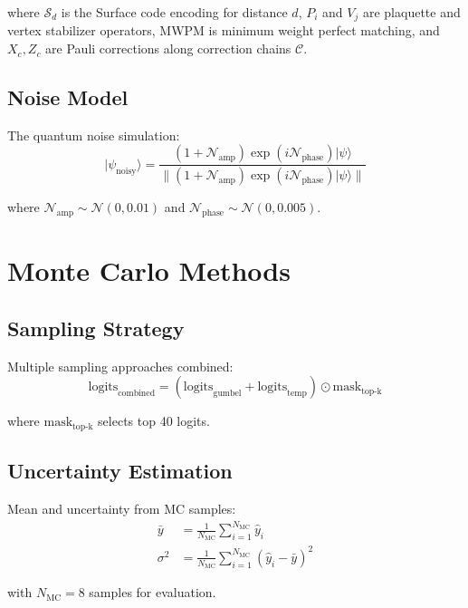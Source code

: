 \documentclass{article}
\begin{document}
where $\mathcal{S}_d$ is the Surface code encoding for distance $d$, $P_i$ and $V_j$ are plaquette and vertex stabilizer operators, MWPM is minimum weight perfect matching, and $X_c, Z_c$ are Pauli corrections along correction chains $\mathcal{C}$.

\subsection{Noise Model}
The quantum noise simulation:
\begin{equation}
|\psi_{\text{noisy}}\rangle = \frac{(1 + \mathcal{N}_{\text{amp}})\exp(i\mathcal{N}_{\text{phase}})|\psi\rangle}{\|(1 + \mathcal{N}_{\text{amp}})\exp(i\mathcal{N}_{\text{phase}})|\psi\rangle\|}
\end{equation}

where $\mathcal{N}_{\text{amp}} \sim \mathcal{N}(0,0.01)$ and $\mathcal{N}_{\text{phase}} \sim \mathcal{N}(0,0.005)$.

\section{Monte Carlo Methods}

\subsection{Sampling Strategy}
Multiple sampling approaches combined:
\begin{equation}
\text{logits}_{\text{combined}} = (\text{logits}_{\text{gumbel}} + \text{logits}_{\text{temp}}) \odot \text{mask}_{\text{top-k}}
\end{equation}

where $\text{mask}_{\text{top-k}}$ selects top 40 logits.

\subsection{Uncertainty Estimation}
Mean and uncertainty from MC samples:
\begin{align*}
\bar{y} &= \frac{1}{N_{\text{MC}}}\sum_{i=1}^{N_{\text{MC}}} \hat{y}_i \\
\sigma^2 &= \frac{1}{N_{\text{MC}}}\sum_{i=1}^{N_{\text{MC}}}(\hat{y}_i - \bar{y})^2
\end{align*}

with $N_{\text{MC}}=8$ samples for evaluation.



\end{document}
